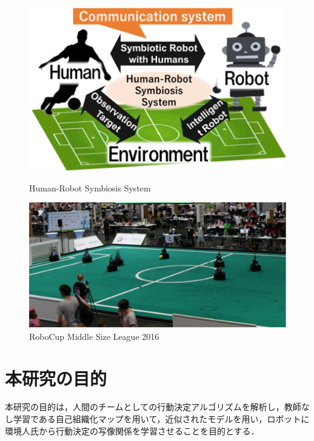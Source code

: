 \clearpage

\begin{figure}[ht]
  \begin{center}
  
    \includegraphics[clip,width=15.0cm]{figure/01_01_Human-Robot_Symbiosis_System.eps}
    \caption{Human-Robot Symbiosis System}
    \label{fig:01_01}
    
    \includegraphics[width=15.0cm]{figure/01_02_RoboCup_Middle_Size_League_2016.eps}
    \caption{RoboCup Middle Size League 2016}
    \label{fig:01_02}
    
  \end{center}
\end{figure}

\clearpage

%
\clearpage
\section{本研究の目的}
本研究の目的は，人間のチームとしての行動決定アルゴリズムを解析し，教師なし学習である自己組織化マップを用いて，近似されたモデルを用い，ロボットに環境人氏から行動決定の写像関係を学習させることを目的とする．

